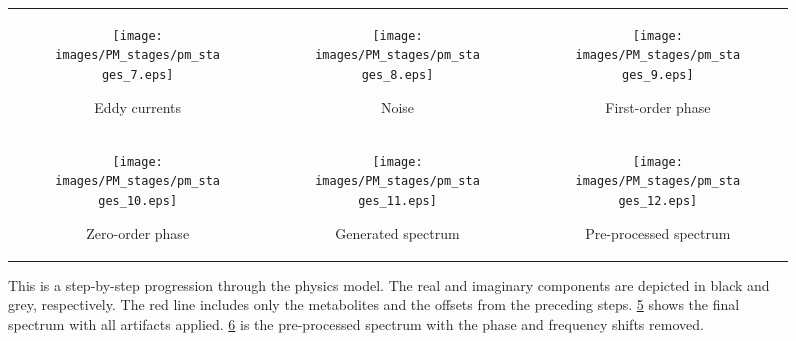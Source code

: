 \begin{figure}
\begin{tabular}[l]{ccc}
\begin{subfigure}[c]{0.315\textwidth}
        \texttt{[image: images/PM\_stages/pm\_stages\_7.eps]}
        \caption{Eddy currents}
        \label{fig:PM_stages:fshift}\vspace{0.2\baselineskip}
    \end{subfigure}&
    \begin{subfigure}[c]{0.315\textwidth}
        \texttt{[image: images/PM\_stages/pm\_stages\_8.eps]}
        \caption{Noise}
        \label{fig:PM_stages:SNR}\vspace{0.2\baselineskip}
    \end{subfigure}&
    \begin{subfigure}[c]{0.315\textwidth}
        \texttt{[image: images/PM\_stages/pm\_stages\_9.eps]}
        \caption{First-order phase}
        \label{fig:PM_stages:residual water}\vspace{0.2\baselineskip}
    \end{subfigure}\\[25pt]
    \begin{subfigure}[c]{0.315\textwidth}
        \texttt{[image: images/PM\_stages/pm\_stages\_10.eps]}
        \vspace{0.5pt}
        \caption{Zero-order phase}
        \label{fig:PM_stages:baseline}
    \end{subfigure}&
    \begin{subfigure}[c]{0.315\textwidth}
        \texttt{[image: images/PM\_stages/pm\_stages\_11.eps]}
        \vspace{0.5mm}
        \caption{Generated spectrum}
        \label{fig:PM_stages:generated spectrum}
    \end{subfigure}&
    \begin{subfigure}[c]{0.315\textwidth}
        \texttt{[image: images/PM\_stages/pm\_stages\_12.eps]} \smallskip
        \caption{Pre-processed spectrum}
        \label{fig:PM_stages:corrected}
    \end{subfigure}
    \end{tabular}
    \caption{This is a step-by-step progression through the physics model. The real and imaginary components are depicted in black and grey, respectively. The red line includes only the metabolites and the offsets from the preceding steps. \ref{fig:PM_stages:generated spectrum} shows the final spectrum with all artifacts applied. \ref{fig:PM_stages:corrected} is the pre-processed spectrum with the phase and frequency shifts removed.}
    \label{fig:PM compilation}
\end{figure}
